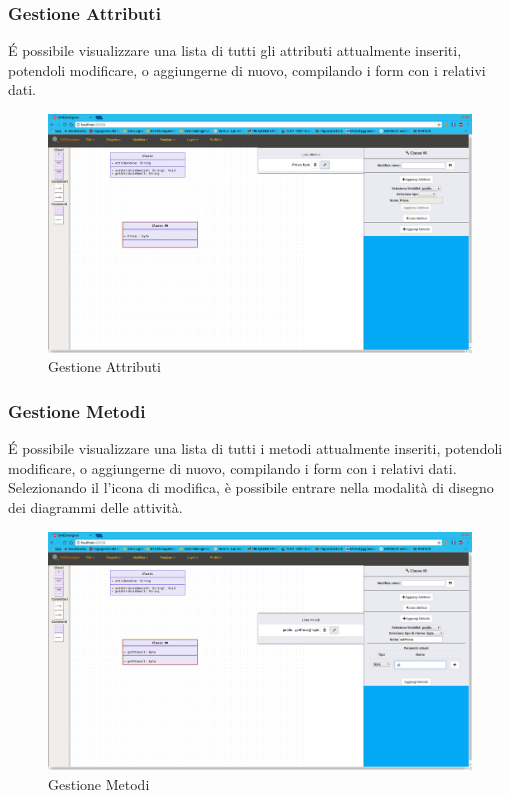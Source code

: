 \subsubsection{Gestione Attributi}
É possibile visualizzare una lista di tutti gli attributi attualmente inseriti, potendoli modificare, o aggiungerne di nuovo, compilando i form con i relativi dati.
\begin{figure}[h!]
	\centering
		\includegraphics[scale=1]{../img/modAttrib.png}
	\caption{Gestione Attributi}
\end{figure}
\newpage

\subsubsection{Gestione Metodi}
É possibile visualizzare una lista di tutti i metodi attualmente inseriti, potendoli modificare, o aggiungerne di nuovo, compilando i form con i relativi dati. Selezionando il l'icona di modifica, è possibile entrare nella modalità di disegno dei diagrammi delle attività.
\begin{figure}[h!]
	\centering
		\includegraphics[scale=1]{../img/editMetod.png}
	\caption{Gestione Metodi}
\end{figure}